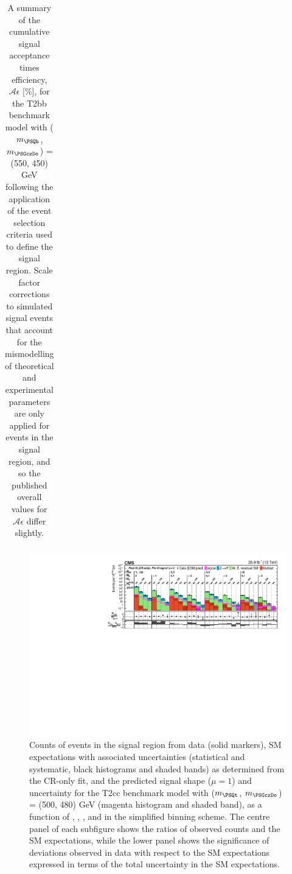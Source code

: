 \begin{table}[p]
\begin{center}
\begin{tabular}{lrr}
      \hline
        \end{tabular}
        \caption{A summary of the cumulative signal acceptance times
        efficiency, $\mathcal{A}\epsilon$ [\%], for the
        T2bb benchmark model with ($m_{\PSQb}$, $m_{\PSGczDo}$) = (550, 450) GeV
        following the application of
        the event selection criteria used to define the signal region.  Scale
        factor corrections to simulated signal events that account for the
        mismodelling of theoretical and experimental parameters are only
        applied for events in the signal region, and so the published overall
        values for $\mathcal{A}\epsilon$ differ slightly.
}
        \label{tab:T2bb_550_450_MR_sig}
    \end{center}
\end{table}

\begin{figure}[p]
    \begin{center}
        \includegraphics[width=1.00\textwidth]{Supplementary/CMS-SUS-16-038_Figure-aux_028.pdf}
  \caption{Counts of events in the signal region from data (solid markers), SM expectations
    with associated uncertainties (statistical and systematic, black
    histograms and shaded bands) as determined from the CR-only fit,
    and the predicted signal shape ($\mu=1$) and uncertainty for the
        T2cc benchmark model with ($m_{\PSQt}$, $m_{\PSGczDo}$) = (500, 480) GeV
        (magenta histogram and shaded band),
    as a function of \njet, \nb, \scalht, and \mht in the simplified binning scheme.
    The centre panel of each subfigure shows the ratios of
    observed counts and the SM expectations, while the lower panel
    shows the significance of deviations observed in data with respect
    to the SM expectations expressed in terms of the total uncertainty
    in the SM expectations.  }
        \label{fig:T2cc_500_480_MR_sig}
    \end{center}
\end{figure}

